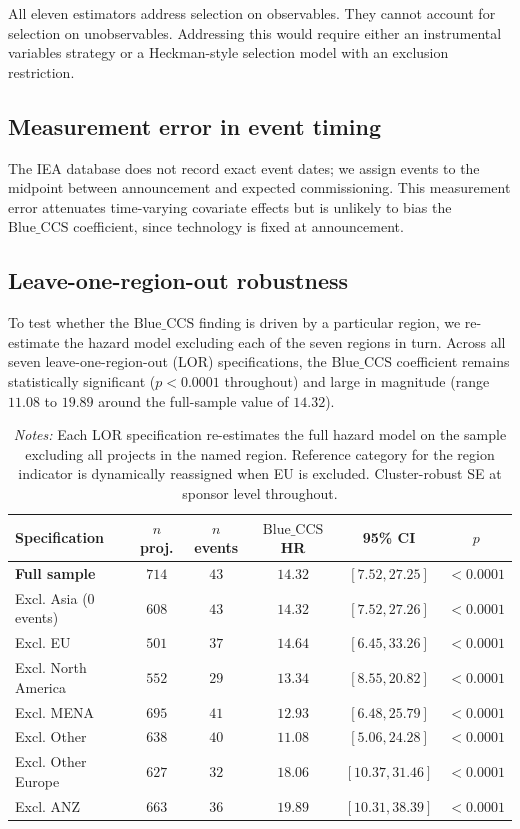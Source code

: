 \documentclass[review,authoryear,11pt]{elsarticle}
\newcommand{\BlueCCS}{\mathrm{Blue\_CCS}}
\begin{document}
All eleven estimators address selection on observables. They cannot account for selection on unobservables. Addressing this would require either an instrumental variables strategy or a Heckman-style selection model \citep{Heckman1979} with an exclusion restriction.

\subsection{Measurement error in event timing}

The IEA database does not record exact event dates; we assign events to the midpoint between announcement and expected commissioning. This measurement error attenuates time-varying covariate effects but is unlikely to bias the $\BlueCCS$ coefficient, since technology is fixed at announcement.

\subsection{Leave-one-region-out robustness}

To test whether the $\BlueCCS$ finding is driven by a particular region, we re-estimate the hazard model excluding each of the seven regions in turn. Across all seven leave-one-region-out (LOR) specifications, the $\BlueCCS$ coefficient remains statistically significant ($p < 0.0001$ throughout) and large in magnitude (range $11.08$ to $19.89$ around the full-sample value of $14.32$).

\begin{table}[H]
\centering
\caption{Leave-one-region-out robustness.}
\label{tab:lor}
\small
\begin{tabular}{lccccc}
\toprule
\textbf{Specification} & \textbf{$n$ proj.} & \textbf{$n$ events} & \textbf{$\BlueCCS$ HR} & \textbf{95\% CI} & \textbf{$p$} \\
\midrule
\textbf{Full sample} & $714$ & $43$ & $\mathbf{14.32}$ & $[7.52, 27.25]$ & $<0.0001$ \\
Excl. Asia (0 events) & $608$ & $43$ & $14.32$ & $[7.52, 27.26]$ & $<0.0001$ \\
Excl. EU & $501$ & $37$ & $14.64$ & $[6.45, 33.26]$ & $<0.0001$ \\
Excl. North America & $552$ & $29$ & $13.34$ & $[8.55, 20.82]$ & $<0.0001$ \\
Excl. MENA & $695$ & $41$ & $12.93$ & $[6.48, 25.79]$ & $<0.0001$ \\
Excl. Other & $638$ & $40$ & $11.08$ & $[5.06, 24.28]$ & $<0.0001$ \\
Excl. Other Europe & $627$ & $32$ & $18.06$ & $[10.37, 31.46]$ & $<0.0001$ \\
Excl. ANZ & $663$ & $36$ & $19.89$ & $[10.31, 38.39]$ & $<0.0001$ \\
\bottomrule
\end{tabular}
\caption*{\footnotesize \textit{Notes:} Each LOR specification re-estimates the full hazard model on the sample excluding all projects in the named region. Reference category for the region indicator is dynamically reassigned when EU is excluded. Cluster-robust SE at sponsor level throughout.}
\end{table}
\end{document}
